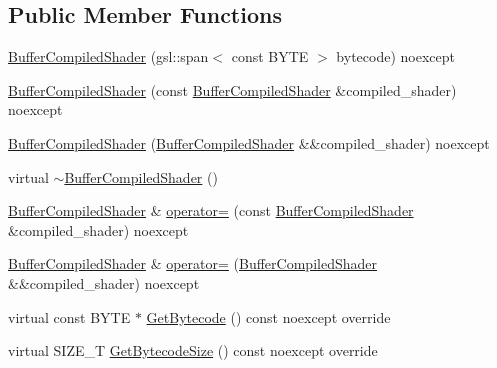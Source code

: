 \subsection*{Public Member Functions}
\begin{DoxyCompactItemize}
\item 
\mbox{\hyperlink{classmage_1_1rendering_1_1_buffer_compiled_shader_ae2a2ce1b29d89125d6413ea9bf773694}{Buffer\+Compiled\+Shader}} (gsl\+::span$<$ const B\+Y\+TE $>$ bytecode) noexcept
\item 
\mbox{\hyperlink{classmage_1_1rendering_1_1_buffer_compiled_shader_a81aeb002f1a4a11b93f70fbeb34c5afc}{Buffer\+Compiled\+Shader}} (const \mbox{\hyperlink{classmage_1_1rendering_1_1_buffer_compiled_shader}{Buffer\+Compiled\+Shader}} \&compiled\+\_\+shader) noexcept
\item 
\mbox{\hyperlink{classmage_1_1rendering_1_1_buffer_compiled_shader_a15ec170bf2864c9dcfa13dff93231a71}{Buffer\+Compiled\+Shader}} (\mbox{\hyperlink{classmage_1_1rendering_1_1_buffer_compiled_shader}{Buffer\+Compiled\+Shader}} \&\&compiled\+\_\+shader) noexcept
\item 
virtual \mbox{\hyperlink{classmage_1_1rendering_1_1_buffer_compiled_shader_af989fa0356f17de9dd75b76aace3f106}{$\sim$\+Buffer\+Compiled\+Shader}} ()
\item 
\mbox{\hyperlink{classmage_1_1rendering_1_1_buffer_compiled_shader}{Buffer\+Compiled\+Shader}} \& \mbox{\hyperlink{classmage_1_1rendering_1_1_buffer_compiled_shader_a1f8eb13198c5bad8ebe55ae1ddf94769}{operator=}} (const \mbox{\hyperlink{classmage_1_1rendering_1_1_buffer_compiled_shader}{Buffer\+Compiled\+Shader}} \&compiled\+\_\+shader) noexcept
\item 
\mbox{\hyperlink{classmage_1_1rendering_1_1_buffer_compiled_shader}{Buffer\+Compiled\+Shader}} \& \mbox{\hyperlink{classmage_1_1rendering_1_1_buffer_compiled_shader_a0e11565292a427dff5b36ef7c26b6d08}{operator=}} (\mbox{\hyperlink{classmage_1_1rendering_1_1_buffer_compiled_shader}{Buffer\+Compiled\+Shader}} \&\&compiled\+\_\+shader) noexcept
\item 
virtual const B\+Y\+TE $\ast$ \mbox{\hyperlink{classmage_1_1rendering_1_1_buffer_compiled_shader_a0887622bd25db8698c572d0dc46167b9}{Get\+Bytecode}} () const noexcept override
\item 
virtual S\+I\+Z\+E\+\_\+T \mbox{\hyperlink{classmage_1_1rendering_1_1_buffer_compiled_shader_a235948a6ba0bcac698d6e35ce3504da2}{Get\+Bytecode\+Size}} () const noexcept override
\end{DoxyCompactItemize}
